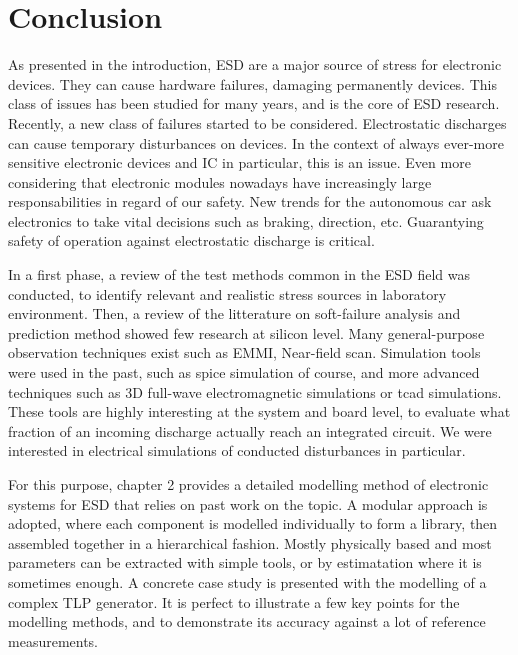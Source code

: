 \chapter{Conclusion}
\label{sec:final-conclusion}

As presented in the introduction, ESD are a major source of stress for electronic devices.
They can cause hardware failures, damaging permanently devices.
This class of issues has been studied for many years, and is the core of ESD research.
Recently, a new class of failures started to be considered.
Electrostatic discharges can cause temporary disturbances on devices.
In the context of always ever-more sensitive electronic devices and IC in particular, this is an issue.
Even more considering that electronic modules nowadays have increasingly large responsabilities in regard of our safety.
New trends for the autonomous car ask electronics to take vital decisions such as braking, direction, etc.
Guarantying safety of operation against electrostatic discharge is critical.

In a first phase, a review of the test methods common in the ESD field was conducted, to identify relevant and realistic stress sources in laboratory environment.
Then, a review of the litterature on soft-failure analysis and prediction method showed few research at silicon level.
Many general-purpose observation techniques exist such as EMMI, Near-field scan.
Simulation tools were used in the past, such as \gls{spice} simulation of course, and more advanced techniques such as 3D full-wave electromagnetic simulations or \gls{tcad} simulations.
These tools are highly interesting at the system and board level, to evaluate what fraction of an incoming discharge actually reach an integrated circuit.
We were interested in electrical simulations of conducted disturbances in particular.

For this purpose, chapter 2 provides a detailed modelling method of electronic systems for ESD that relies on past work on the topic.
A modular approach is adopted, where each component is modelled individually to form a library, then assembled together in a hierarchical fashion.
Mostly physically based and most parameters can be extracted with simple tools, or by estimatation where it is sometimes enough.
A concrete case study is presented with the modelling of a complex TLP generator.
It is perfect to illustrate a few key points for the modelling methods, and to demonstrate its accuracy against a lot of reference measurements.

